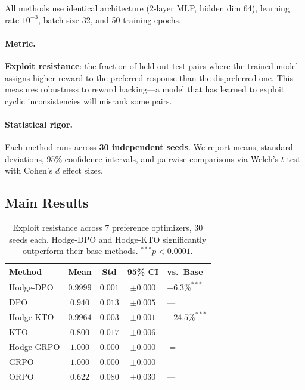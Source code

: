 \documentclass{article}
\begin{document}
All methods use identical architecture (2-layer MLP, hidden dim 64), learning rate $10^{-3}$, batch size 32, and 50 training epochs.

\paragraph{Metric.} \textbf{Exploit resistance}: the fraction of held-out test pairs where the trained model assigns higher reward to the preferred response than the dispreferred one. This measures robustness to reward hacking---a model that has learned to exploit cyclic inconsistencies will misrank some pairs.

\paragraph{Statistical rigor.} Each method runs across \textbf{30 independent seeds}. We report means, standard deviations, 95\% confidence intervals, and pairwise comparisons via Welch's $t$-test with Cohen's $d$ effect sizes.

\subsection{Main Results}

\begin{table}[t]
\centering
\caption{Exploit resistance across 7 preference optimizers, 30 seeds each. Hodge-DPO and Hodge-KTO significantly outperform their base methods. $^{***}p < 0.0001$.}
\label{tab:main_results}
\vskip 0.1in
\begin{tabular}{@{}lcccl@{}}
\toprule
\textbf{Method} & \textbf{Mean} & \textbf{Std} & \textbf{95\% CI} & \textbf{vs.\ Base} \\
\midrule
Hodge-DPO  & $\mathbf{0.9999}$ & $0.001$ & $\pm 0.000$ & $+6.3\%^{***}$ \\
DPO        & $0.940$ & $0.013$ & $\pm 0.005$ & --- \\
\midrule
Hodge-KTO  & $\mathbf{0.9964}$ & $0.003$ & $\pm 0.001$ & $+24.5\%^{***}$ \\
KTO        & $0.800$ & $0.017$ & $\pm 0.006$ & --- \\
\midrule
Hodge-GRPO & $1.000$ & $0.000$ & $\pm 0.000$ & $=$ \\
GRPO       & $1.000$ & $0.000$ & $\pm 0.000$ & --- \\
\midrule
ORPO       & $0.622$ & $0.080$ & $\pm 0.030$ & --- \\
\bottomrule
\end{tabular}
\end{table}
\end{document}
